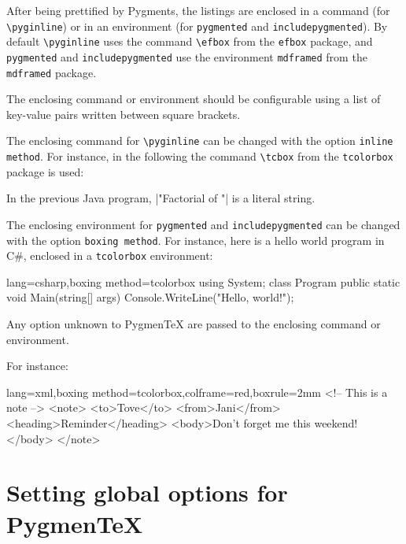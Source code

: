 \documentclass[10pt,a4paper]{article}
\begin{document}
After being prettified by Pygments, the listings are enclosed in a
command (for \verb|\pyginline|) or in an environment (for
\verb|pygmented| and \verb|includepygmented|). By default
\verb|\pyginline| uses the command \verb|\efbox| from the \texttt{efbox}
package, and \verb|pygmented| and \verb|includepygmented| use the
environment \verb|mdframed| from the \texttt{mdframed} package.

The enclosing command or environment should be configurable using a list
of key-value pairs written between square brackets.

The enclosing command for
\verb|\pyginline| can be changed with the option
\verb|inline method|. For instance, in the following the command
\verb|\tcbox| from the \verb|tcolorbox| package is used:

\begin{Example}
In the previous Java program,
\pyginline[lang=java,inline method=tcbox]|"Factorial of "| is a
literal string.
\end{Example}

The enclosing environment for \verb|pygmented| and
\verb|includepygmented| can be changed with the option
\verb|boxing method|. For instance, here is a hello world program in
C\#, enclosed in a \verb|tcolorbox| environment:

\begin{Example}
\begin{pygmented}{lang=csharp,boxing method=tcolorbox}
using System;
class Program
{
public static void Main(string[] args)
{
Console.WriteLine("Hello, world!");
}
}
\end{pygmented}
\end{Example}

Any option unknown to Pygmen\TeX{} are passed to the enclosing command
or environment.

For instance:

\begin{Example}
\begin{pygmented}{lang=xml,boxing method=tcolorbox,colframe=red,boxrule=2mm}
<!-- This is a note -->
<note>
<to>Tove</to>
<from>Jani</from>
<heading>Reminder</heading>
<body>Don't forget me this weekend!</body>
</note>
\end{pygmented}
\end{Example}

\section{Setting global options for Pygmen\TeX{}}
\end{document}
